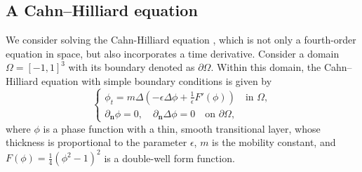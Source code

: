 \documentclass{article}
\begin{document}
\subsection{A Cahn--Hilliard equation}
We consider solving the Cahn-Hilliard equation \cite{cahn1958free}, which is not only a fourth-order equation in space, but also incorporates a time derivative. Consider a domain $\Omega=[-1,1]^3$ with its boundary denoted as $\partial \Omega$. Within this domain, the Cahn--Hilliard equation with simple boundary conditions  is given by
\begin{equation}\label{CH}
    \begin{cases}
        \phi_t = m\Delta\left(-\epsilon \Delta \phi + \frac{1}{\epsilon}F'(\phi)\right)\quad\text{in}\,\,\Omega,\\
        \partial_{\bm{n}}\phi =0,\quad \partial_{\bm{n}}\Delta \phi = 0\quad\text{on}\,\,\partial\Omega,
    \end{cases}
\end{equation}
where $\phi$ is a phase function with a thin, smooth transitional layer, whose thickness is proportional to the parameter $\epsilon$, $m$ is the mobility constant, and $F(\phi)=\frac{1}{4}(\phi^2-1)^2$ is a double-well form function.
\end{document}
